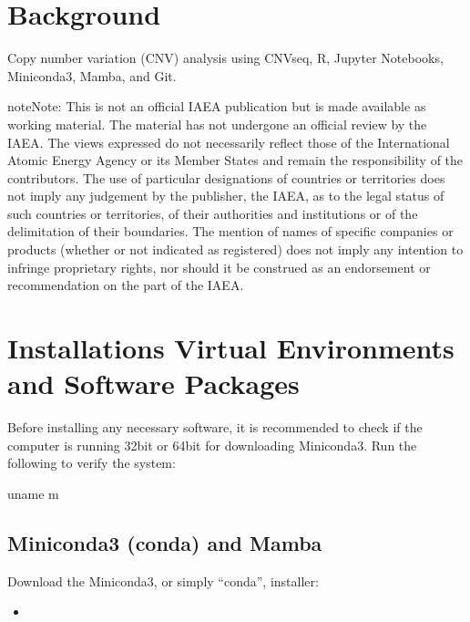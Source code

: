 \documentclass[letterpaper,10pt,english]{sphinxhowto}
\begin{document}
\pagestyle{plain}
\sphinxtableofcontents
\pagestyle{normal}
\label{\detokenize{index::doc}}



\section{Background}
\label{\detokenize{index:background}}
\sphinxAtStartPar
{}

\sphinxAtStartPar
Copy number variation (CNV) analysis using CNVseq, R, Jupyter Notebooks, Miniconda3, Mamba, and Git.

\begin{sphinxadmonition}{note}{Note:}
\sphinxAtStartPar
This is not an official IAEA publication but is made available as working material. The material has not undergone an official review by the IAEA. The views expressed do not necessarily reflect those of the International Atomic Energy Agency or its Member States and remain the responsibility of the contributors. The use of particular designations of countries or territories does not imply any judgement by the publisher, the IAEA, as to the legal status of such countries or territories, of their authorities and institutions or of the delimitation of their boundaries. The mention of names of specific companies or products (whether or not indicated as registered) does not imply any intention to infringe proprietary rights, nor should it be construed as an endorsement or recommendation on the part of the IAEA.
\end{sphinxadmonition}


\section{Installations \sphinxhyphen{} Virtual Environments and Software Packages}
\label{\detokenize{index:installations-virtual-environments-and-software-packages}}
\sphinxAtStartPar
Before installing any necessary software, it is recommended to check if the computer is running 32\sphinxhyphen{}bit or 64\sphinxhyphen{}bit for downloading Miniconda3. Run the following to verify the system:

\begin{sphinxVerbatim}[commandchars=\\\{\}]
\PYGZdl{} uname \PYGZhy{}m
\end{sphinxVerbatim}


\subsection{Miniconda3 (conda) and Mamba}
\label{\detokenize{index:miniconda3-conda-and-mamba}}
\sphinxAtStartPar
Download the Miniconda3, or simply “conda”, installer:
\begin{itemize}
\item {} 
\sphinxAtStartPar
{}

\end{itemize}
\end{document}
